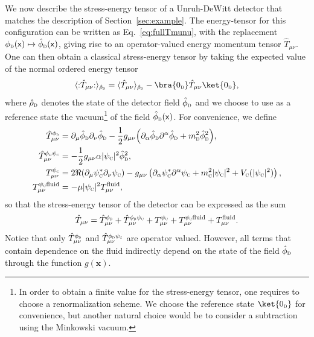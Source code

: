 \documentclass[letterpaper,12pt,titlepage,oneside,final]{book}
\newcommand{\normord}[1]{\vcentcolon\mathrel{#1}\vcentcolon}
\providecommand{\vcentcolon}{\mathrel{\mathop{:}}}
\newcommand{\mf}{\mathsf}%
\newcommand{\tc}[1]{\textsc{#1}}
\begin{document}
We now describe the stress-energy tensor of a Unruh-DeWitt detector that matches the description of Section~\ref{sec:example}. The energy-tensor for this configuration can be written as Eq.~\eqref{eq:fullTmunu}, with the replacement $\phi_\tc{d}(\mf x)\mapsto \hat{\phi}_\tc{d}(\mf x)$, giving rise to an operator-valued energy momentum tensor $\hat{T}_{\mu\nu}$. One can then obtain a classical stress-energy tensor by taking the expected value of the normal ordered energy tensor
\begin{equation}
    \langle\normord{\hat{T}_{\mu\nu}}\rangle_{\hat{\rho}_\tc{d}} = \langle\hat{T}_{\mu\nu}\rangle_{\hat{\rho}_\tc{d}} - \bra{0_\tc{d}}\hat{T}_{\mu\nu}\ket{0_\tc{d}},
\end{equation}
where $\hat{\rho}_\tc{d}$ denotes the state of the detector field $\hat{\phi}_\tc{d}$ and we choose to use as a reference state the vacuum\footnote{In order to obtain a finite value for the stress-energy tensor, one requires to choose a renormalization scheme. We choose the reference state $\ket{0_\tc{d}}$ for convenience, but another natural choice would be to consider a subtraction using the Minkowski vacuum.} of the field $\hat{\phi}_\tc{d}(\mf x)$. For convenience, we define
\begin{align}
    \hat{T}_{\mu\nu}^{\phi_\tc{d}} &=  \partial_\mu \hat{\phi}_{\tc{d}}\partial_\nu \hat{\phi}_{\tc{d}} -\frac{1}{2}g_{\mu\nu}\!\left(\partial_\alpha \hat{\phi}_{\tc{d}}\partial^\alpha \hat{\phi}_{\tc{d}} + m_{\tc{d}}^2 \hat{\phi}_\tc{d}^2\right)\!, \\
    \hat{T}_{\mu\nu}^{\phi_\tc{d}\psi_\tc{c}} &= -\frac{1}{2}g_{\mu\nu}\alpha |\psi_\tc{c}|^2 \hat{\phi}_\tc{d}^2,\\
    T_{\mu\nu}^{\psi_\tc{c}} &= 2\Re(\partial_\mu \psi_{\tc{c}}^*\partial_\nu \psi_{\tc{c}})-g_{\mu\nu}\left(\partial_\alpha \psi_{\tc{c}}^*\partial^\alpha \psi_{\tc{c}} + m_{\tc{c}}^2 |\psi_\tc{c}|^2  +  V_\tc{c}(|\psi_\tc{c}|^2)\right),\nonumber\\
    T_{\mu\nu}^{\psi_\tc{c}\text{fluid}} &=  -\mu |\psi_\tc{c}|^2T^\textrm{fluid}_{\mu\nu},
\end{align}
so that the stress-energy tensor of the detector can be expressed as the sum
\begin{equation}
    \hat{T}_{\mu\nu} = \hat{T}_{\mu\nu}^{\phi_\tc{d}} + \hat{T}_{\mu\nu}^{\phi_\tc{d}\psi_\tc{c}} + T_{\mu\nu}^{\psi_\tc{c}} + T_{\mu\nu}^{\psi_\tc{c}\text{fluid}} + T^\textrm{fluid}_{\mu\nu}.
\end{equation}
Notice that only $\hat{T}_{\mu\nu}^{\phi_\tc{d}}$ and $\hat{T}_{\mu\nu}^{\phi_\tc{d}\psi_\tc{c}}$ are operator valued. However, all terms that contain dependence on the fluid indirectly depend on the state of the field $\hat{\phi}_\tc{d}$ through the function $g(\bm x)$. 
\end{document}
